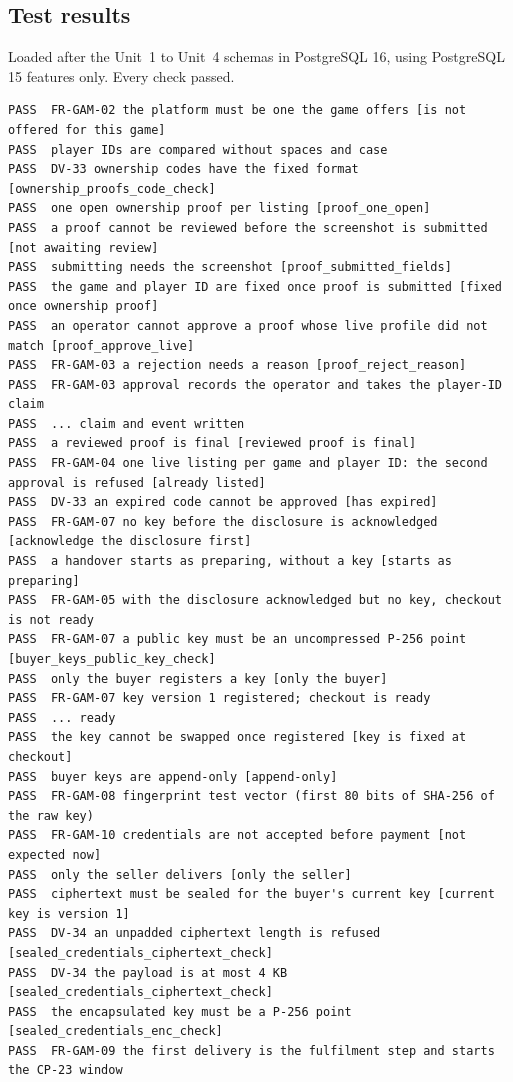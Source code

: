 \documentclass[11pt,a4paper]{article}
\begin{document}
\subsection{Test results}
\label{app:tests}
Loaded after the Unit~1 to Unit~4 schemas in PostgreSQL 16, using PostgreSQL 15 features only. Every check passed.
{\scriptsize
\begin{verbatim}
PASS  FR-GAM-02 the platform must be one the game offers [is not offered for this game]
PASS  player IDs are compared without spaces and case
PASS  DV-33 ownership codes have the fixed format [ownership_proofs_code_check]
PASS  one open ownership proof per listing [proof_one_open]
PASS  a proof cannot be reviewed before the screenshot is submitted [not awaiting review]
PASS  submitting needs the screenshot [proof_submitted_fields]
PASS  the game and player ID are fixed once proof is submitted [fixed once ownership proof]
PASS  an operator cannot approve a proof whose live profile did not match [proof_approve_live]
PASS  FR-GAM-03 a rejection needs a reason [proof_reject_reason]
PASS  FR-GAM-03 approval records the operator and takes the player-ID claim
PASS  ... claim and event written
PASS  a reviewed proof is final [reviewed proof is final]
PASS  FR-GAM-04 one live listing per game and player ID: the second approval is refused [already listed]
PASS  DV-33 an expired code cannot be approved [has expired]
PASS  FR-GAM-07 no key before the disclosure is acknowledged [acknowledge the disclosure first]
PASS  a handover starts as preparing, without a key [starts as preparing]
PASS  FR-GAM-05 with the disclosure acknowledged but no key, checkout is not ready
PASS  FR-GAM-07 a public key must be an uncompressed P-256 point [buyer_keys_public_key_check]
PASS  only the buyer registers a key [only the buyer]
PASS  FR-GAM-07 key version 1 registered; checkout is ready
PASS  ... ready
PASS  the key cannot be swapped once registered [key is fixed at checkout]
PASS  buyer keys are append-only [append-only]
PASS  FR-GAM-08 fingerprint test vector (first 80 bits of SHA-256 of the raw key)
PASS  FR-GAM-10 credentials are not accepted before payment [not expected now]
PASS  only the seller delivers [only the seller]
PASS  ciphertext must be sealed for the buyer's current key [current key is version 1]
PASS  DV-34 an unpadded ciphertext length is refused [sealed_credentials_ciphertext_check]
PASS  DV-34 the payload is at most 4 KB [sealed_credentials_ciphertext_check]
PASS  the encapsulated key must be a P-256 point [sealed_credentials_enc_check]
PASS  FR-GAM-09 the first delivery is the fulfilment step and starts the CP-23 window

\end{verbatim}}
\end{document}
